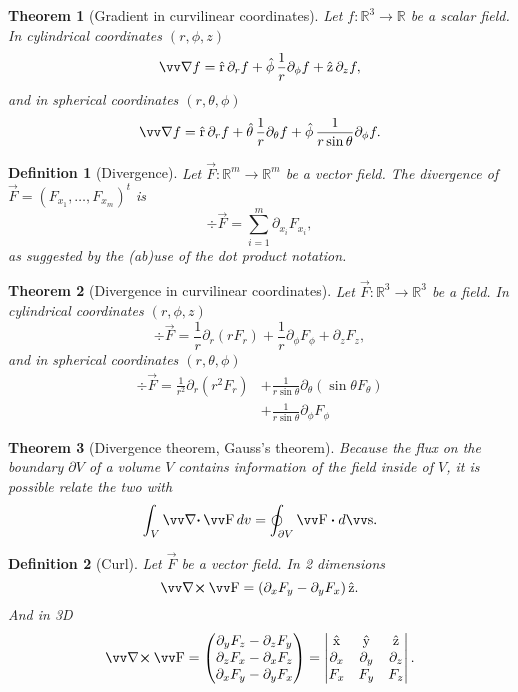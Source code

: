 \documentclass[margin=normal]{tex/hsrzf}
\theoremstyle{elmagzf}
\newtheorem{theorem}{Theorem}
\newtheorem{definition}{Definition}
\begin{document}
\begin{theorem}[Gradient in curvilinear coordinates]
  Let \(f: \mathbb{R}^3 \to \mathbb{R}\) be a scalar field. In cylindrical
  coordinates \((r,\phi,z)\)
  \[
    \grad f = \uvec{r}\,\partial_r f 
      + \uvec{\phi}\,\frac{1}{r}\partial_\phi f
      + \uvec{z}\,\partial_z f,
  \]
  and in spherical coordinates \((r,\theta,\phi)\)
  \[
    \grad f = \uvec{r}\,\partial_r f
      + \uvec{\theta}\,\frac{1}{r} \partial_\theta f
      + \uvec{\phi}\,\frac{1}{r \sin\theta} \partial_\phi f.
  \]
\end{theorem}

\begin{definition}[Divergence]
  Let \(\vec{F}: \mathbb{R}^m \to \mathbb{R}^m\) be a vector field.
  The divergence of \(\vec{F} = (F_{x_1},\ldots, F_{x_m})^t\) is
  \[
    \div\vec{F} = \sum_{i = 1}^m \partial_{x_i} F_{x_i} ,
  \]
  as suggested by the (ab)use of the dot product notation.
\end{definition}

\begin{theorem}[Divergence in curvilinear coordinates]
  Let \(\vec{F}: \mathbb{R}^3 \to \mathbb{R}^3\) be a field. In cylindrical
  coordinates \((r,\phi,z)\)
  \[
    \div \vec{F} = \frac{1}{r} \partial_r (r F_r)
      + \frac{1}{r}\partial_\phi F_\phi
      + \partial_z F_z,
  \]
  and in spherical coordinates \((r,\theta,\phi)\)
  \begin{align*}
    \div \vec{F} = \frac{1}{r^2} \partial_r (r^2 F_r)
      & + \frac{1}{r \sin\theta} \partial_\theta (\sin\theta F_\theta) \\
      & + \frac{1}{r \sin\theta} \partial_\phi F_\phi
  \end{align*}
\end{theorem}

\begin{theorem}[Divergence theorem, Gauss's theorem]
  Because the flux on the boundary \(\partial V\) of a volume \(V\) contains
  information of the field inside of \(V\), it is possible relate the two with
  \[
    \int_V \div \vec{F} \,dv = \oint_{\partial V} \vec{F} \dotp d\vec{s} .
  \]
\end{theorem}

\begin{definition}[Curl]
  Let \(\vec{F}\) be a vector field. In 2 dimensions
  \[
    \curl \vec{F} = \left(\partial_x F_y - \partial_y F_x\right)\uvec{z}.
  \]
  And in 3D
  \[
    \curl \vec{F} = \begin{pmatrix}
      \partial_y F_z - \partial_z F_y \\
      \partial_z F_x - \partial_x F_z \\
      \partial_x F_y - \partial_y F_x
    \end{pmatrix}
    = \begin{vmatrix}
      \uvec{x} & \uvec{y} & \uvec{z} \\
      \partial_x & \partial_y & \partial_z \\
      F_x & F_y & F_z
    \end{vmatrix} .
  \]
\end{definition}
\end{document}
